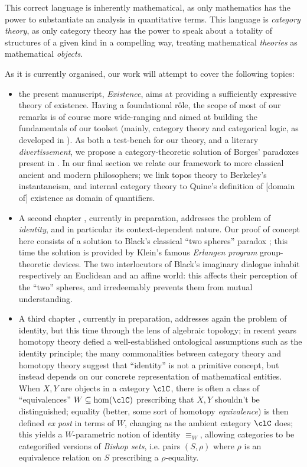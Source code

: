 This correct language is inherently mathematical, as only mathematics has the power to substantiate an analysis in quantitative terms. This language is \emph{category theory}, as only category theory has the power to speak about a totality of structures of a given kind in a compelling way, treating mathematical \emph{theories} as mathematical \emph{objects}.

As it is currently organised, our work will attempt to cover the following topics:
\begin{itemize}
	\item the present manuscript, \emph{Existence}, aims at providing a sufficiently expressive theory of existence. Having a foundational r\^ole, the scope of most of our remarks is of course more wide-ranging and aimed at building the fundamentals of our toolset (mainly, category theory and categorical logic, as developed in \cite{mac1992sheaves,JohnstonePT,lambek1988introduction}). As both a test-bench for our theory, and a literary \emph{divertissement}, we propose a category-theoretic solution of Borges' paradoxes present in \cite{fictions}. In our final section we relate our framework to more classical ancient and modern philosophers; we link topos theory to Berkeley's instantaneism, and internal category theory to Quine's definition of [domain of] existence as domain of quantifiers.
	\item A second chapter \cite{black}, currently in preparation, addresses the problem of \emph{identity}, and in particular its context-dependent nature. Our proof of concept here consists of a solution to Black's classical ``two spheres'' paradox \cite{papear_di_black}; this time the solution is provided by Klein's famous \emph{Erlangen program} group-theoretic devices. The two interlocutors of Black's imaginary dialogue inhabit respectively an Euclidean and an affine world: this affects their perception of the ``two'' spheres, and irredeemably prevents them from mutual understanding.
	\item A third chapter \cite{homot}, currently in preparation, addresses again the problem of identity, but this time through the lens of algebraic topology; in recent years homotopy theory defied a well\hyp{}established ontological assumptions such as the identity principle; the many commonalities between category theory and homotopy theory suggest that ``identity'' is not a primitive concept, but instead depends on our concrete representation of mathematical entities. When $X,Y$ are objects in a category $\clC$, there is often a class of ``equivalences'' $W \subseteq \hom(\clC)$ prescribing that $X,Y$ shouldn't be distinguished; equality (better, some sort of homotopy \emph{equivalence}) is then defined \emph{ex post} in terms of $W$, changing as the ambient category $\clC$ does; this yields a $W$-parametric notion of identity $\equiv_W$, allowing categories to be categorified versions of \emph{Bishop sets}, i.e. pairs $(S,\rho)$ where $\rho$ is an equivalence relation on $S$ prescribing a $\rho$-equality.
\end{itemize}
